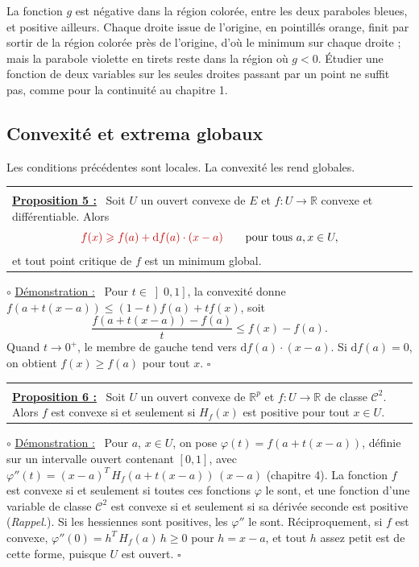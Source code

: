 \documentclass[a4paper,twoside]{report}
\makeatletter
\newcommand{\rmath}[1]{\textcolor{rougecours}{#1}}
\newenvironment{cadre}%
 {\par\vspace{2mm}\noindent\begin{tabular}{|@{\hspace{4mm}}p{0.93\textwidth}@{\hspace{4mm}}|}
  \hline \\[-2mm]}%
 {\\[2mm] \hline \end{tabular}\par\vspace{3mm}}
\newcommand{\propo}[1]{\textbf{\underline{Proposition #1 :}}~}
\newenvironment{demo}%
 {\par\needspace{4\baselineskip}\vspace{1mm}\noindent$\circ$ \underline{Démonstration :}~\setlength{\parskip}{3pt plus 1pt}}%
 {\hfill$\square$\par\vspace{2mm}}
\newcommand{\R}{\mathbb{R}}
\newcommand{\dd}{\mathrm{d}}                      %
\newcommand{\tra}[1]{{#1}^{T}}                    %
\newcommand{\Cc}{\mathcal{C}}                     %
\newcommand{\Hs}{H}                               %
\makeatother
\begin{document}
\noindent La fonction $g$ est négative dans la région colorée, entre les deux paraboles bleues, et positive ailleurs. Chaque droite issue de l'origine, en pointillés orange, finit par sortir de la région colorée près de l'origine, d'où le minimum sur chaque droite ; mais la parabole violette en tirets reste dans la région où $g < 0$. Étudier une fonction de deux variables sur les seules droites passant par un point ne suffit pas, comme pour la continuité au chapitre 1.

\subsection{Convexité et extrema globaux}

Les conditions précédentes sont locales. La convexité les rend globales.

\begin{cadre}
\propo{5} Soit $U$ un ouvert convexe de $E$ et $f : U \to \R$ convexe et différentiable. Alors
\[ \rmath{f(x) \geqslant f(a) + \dd f(a)\cdot(x - a)} \qquad \text{pour tous } a, x \in U, \]
et tout point critique de $f$ est un minimum global.
\end{cadre}

\begin{demo}
Pour $t \in \left]0, 1\right]$, la convexité donne $f(a + t(x - a)) \leqslant (1 - t)f(a) + tf(x)$, soit
\[ \frac{f(a + t(x - a)) - f(a)}{t} \leqslant f(x) - f(a). \]
Quand $t \to 0^{+}$, le membre de gauche tend vers $\dd f(a)\cdot(x - a)$. Si $\dd f(a) = 0$, on obtient $f(x) \geqslant f(a)$ pour tout $x$.
\end{demo}

\begin{cadre}
\propo{6} Soit $U$ un ouvert convexe de $\R^{p}$ et $f : U \to \R$ de classe $\Cc^{2}$. Alors $f$ est convexe si et seulement si $\Hs_{f}(x)$ est positive pour tout $x \in U$.
\end{cadre}

\begin{demo}
Pour $a$, $x \in U$, on pose $\varphi(t) = f(a + t(x - a))$, définie sur un intervalle ouvert contenant $[0, 1]$, avec $\varphi''(t) = \tra{(x - a)}\,\Hs_{f}(a + t(x - a))\,(x - a)$ (chapitre 4). La fonction $f$ est convexe si et seulement si toutes ces fonctions $\varphi$ le sont, et une fonction d'une variable de classe $\Cc^{2}$ est convexe si et seulement si sa dérivée seconde est positive (\emph{Rappel.}). Si les hessiennes sont positives, les $\varphi''$ le sont. Réciproquement, si $f$ est convexe, $\varphi''(0) = \tra{h}\,\Hs_{f}(a)\,h \geqslant 0$ pour $h = x - a$, et tout $h$ assez petit est de cette forme, puisque $U$ est ouvert.
\end{demo}
\end{document}
